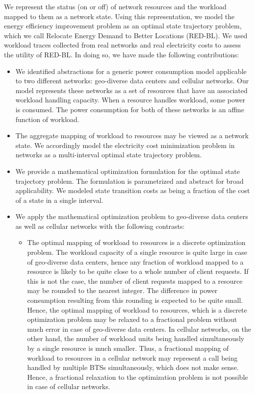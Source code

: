 We represent the status (on or off) of network resources and the workload mapped to them as a network state. Using this representation, we model the energy efficiency improvement problem as an optimal state trajectory problem, which we call Relocate Energy Demand to Better Locations (RED-BL). We used workload traces collected from real networks and real electricity costs to assess the utility of RED-BL. In doing so, we have made the following contributions:
\begin{itemize}
\item We identified abstractions for a generic power consumption model applicable to two different networks: geo-diverse data centers and cellular networks. Our model represents these networks as a set of resources that have an associated workload handling capacity. When a resource handles workload, some power is consumed. The power consumption for both of these networks is an affine function of workload. 
\item The aggregate mapping of workload to resources may be viewed as a network state. We accordingly model the electricity cost minimization problem in networks as a multi-interval optimal state trajectory problem.
\item We provide a mathematical optimization formulation for the optimal state trajectory problem. The formulation is parametrized and abstract for broad applicability. We modeled state transition costs as being a fraction of the cost of a state in a single interval.
\item We apply the mathematical optimization problem to geo-diverse data centers as well as cellular networks with the following contrasts:
	\begin{itemize}
	\item The optimal mapping of workload to resources is a discrete optimization problem. The workload capacity of a single resource is quite large in case of geo-diverse data centers, hence any fraction of workload mapped to a resource is likely to be quite close to a whole number of client requests. If this is not the case, the number of client requests mapped to a resource may be rounded to the nearest integer. The difference in power consumption resulting from this rounding is expected to be quite small. Hence, the optimal mapping of workload to resources, which is a discrete optimization problem may be relaxed to a fractional problem without much error in case of geo-diverse data centers. In cellular networks, on the other hand, the number of workload units being handled simultaneously by a single resource is much smaller. Thus, a fractional mapping of workload to resources in a cellular network may represent a call being handled by multiple BTSs simultaneously, which does not make sense. Hence, a fractional relaxation to the optimization problem is not possible in case of cellular networks.

\end{itemize}
\end{itemize}
